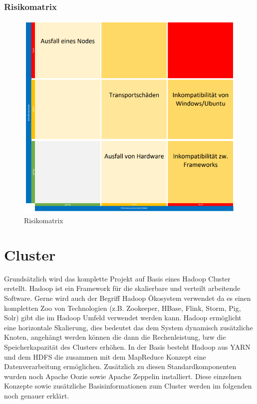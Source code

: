 \documentclass[12pt,oneside,a4paper,parskip]{scrbook}
\begin{document}
\subsection{Risikomatrix}
\begin{figure}[h!]
\caption{Risikomatrix}
\label{risikoMatrix}
\centering
\includegraphics[scale=1.0]{pictures/risikoanalyse.png}
\end{figure}


\chapter{Cluster}
Grunds\"atzlich wird das komplette Projekt auf Basis eines Hadoop Cluster erstellt. Hadoop ist ein Framework f\"ur die skalierbare und verteilt arbeitende Software. Gerne wird auch der Begriff  Hadoop \"Okosystem verwendet da es einen kompletten Zoo von Technologien (z.B. Zookeeper, HBase, Flink, Storm, Pig, Solr) gibt die im Hadoop Umfeld verwendet werden kann. Hadoop erm\"oglicht eine horizontale Skalierung, dies bedeutet das dem System dynamisch zus\"atzliche Knoten, angeh\"angt werden k\"onnen die dann die Rechenleistung, bzw die Speicherkapazit\"at des Clusters erh\"ohen. In der Basis besteht Hadoop aus YARN und dem HDFS die zusammen mit dem MapReduce Konzept eine Datenverarbeitung erm\"oglichen. Zus\"atzlich zu diesen Standardkomponenten wurden noch Apache Oozie sowie Apache Zeppelin installiert. Diese einzelnen Konzepte sowie zus\"atzliche Basisinformationen zum Cluster werden im folgenden noch genauer erkl\"art.
\end{document}
